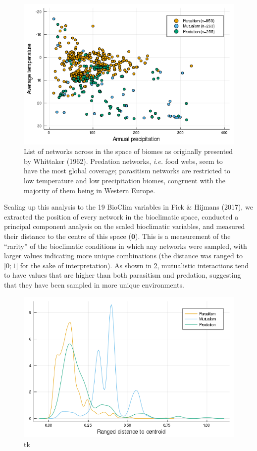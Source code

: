 \begin{figure}
\hypertarget{fig:biomes}{%
\centering
\includegraphics{figures/figure_02.png}
\caption{List of networks across in the space of biomes as originally
presented by Whittaker (1962). Predation networks, \emph{i.e.} food
webs, seem to have the most global coverage; parasitism networks are
restricted to low temperature and low precipitation biomes, congruent
with the majority of them being in Western Europe.}\label{fig:biomes}
}
\end{figure}

Scaling up this analysis to the 19 BioClim variables in Fick \& Hijmans
(2017), we extracted the position of every network in the bioclimatic
space, conducted a principal component analysis on the scaled
bioclimatic variables, and measured their distance to the centre of this
space (\(\mathbf{0}\)). This is a measurement of the ``rarity'' of the
bioclimatic conditions in which any networks were sampled, with larger
values indicating more unique combinations (the distance was ranged to
\(]0;1]\) for the sake of interpretation). As shown in \cref{fig:ecc},
mutualistic interactions tend to have values that are higher than both
parasitism and predation, suggesting that they have been sampled in more
unique environments.

\begin{figure}
\hypertarget{fig:ecc}{%
\centering
\includegraphics{figures/figure_05_b.png}
\caption{tk}\label{fig:ecc}
}
\end{figure}

